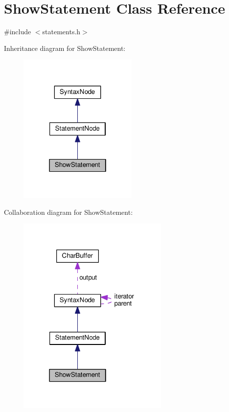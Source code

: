 \hypertarget{classShowStatement}{}\section{Show\+Statement Class Reference}
\label{classShowStatement}


{\ttfamily \#include $<$statements.\+h$>$}



Inheritance diagram for Show\+Statement\+:
\nopagebreak
\begin{figure}[H]
\begin{center}
\leavevmode
\includegraphics[width=166pt]{da/d26/classShowStatement__inherit__graph}
\end{center}
\end{figure}


Collaboration diagram for Show\+Statement\+:
\nopagebreak
\begin{figure}[H]
\begin{center}
\leavevmode
\includegraphics[width=211pt]{d3/d23/classShowStatement__coll__graph}
\end{center}
\end{figure}
